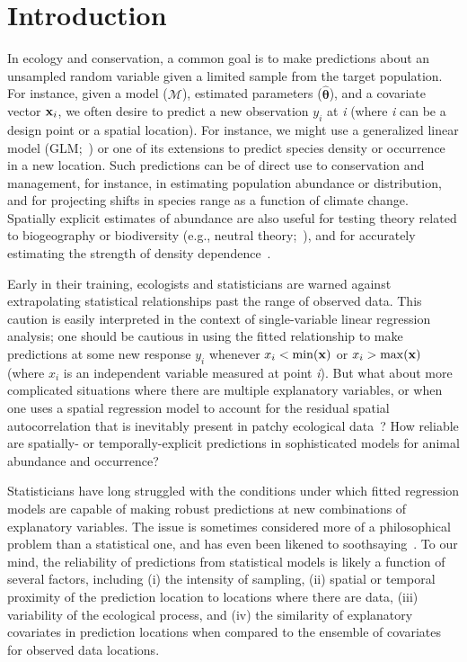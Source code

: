 \documentclass[10pt,letterpaper]{article}
\begin{document}
\section*{Introduction}
In ecology and conservation, a common goal is to make predictions about an unsampled random variable given a limited sample from the target population.  For instance, given a model ($\mathcal{M}$), estimated parameters ($\hat{\boldsymbol{\theta}}$), and a covariate vector ${\bf x}_i$, we often desire to predict a new observation $y_i$ at \textit{i} (where \textit{i} can be a design point or a spatial location).  For instance, we might use a generalized linear model (GLM;~\cite{McCullaghNelder1989}) or one of its extensions to predict species density or occurrence in a new location.  Such predictions can be of direct use to conservation and management, for instance, in estimating population abundance or distribution, and for projecting shifts in species range as a function of climate change. Spatially explicit estimates of abundance are also useful for testing theory related to biogeography or biodiversity (e.g., neutral theory;~\cite{Hubbell2001}), and for accurately estimating the strength of density dependence~\cite{ThorsonEtAlInPress}.

Early in their training, ecologists and statisticians are warned against extrapolating statistical relationships
past the range of observed data.  This caution is easily interpreted in the context of single-variable linear regression analysis; one should be cautious in using the fitted relationship to make predictions at some new response $y_i$ whenever $x_i < \min({\bf x})$ or $x_i > \max({\bf x})$ (where $x_i$ is an independent variable measured at point \textit{i}).  But what about more complicated situations
where there are multiple explanatory variables, or when one uses a spatial regression model to account for the residual spatial autocorrelation that is inevitably present in patchy ecological data~\cite{LichsteinEtAl2002}?  How reliable are spatially- or temporally-explicit predictions in sophisticated models for animal abundance and occurrence?

Statisticians have long struggled with the conditions under which fitted regression models are capable of
making robust predictions at new combinations of explanatory variables.  The issue is sometimes considered more of a
philosophical problem than a statistical one, and has even been likened to soothsaying~\cite{EhrenbergBound1993}.  To our mind, the reliability of predictions from statistical models is likely a function of several factors, including (i) the intensity of sampling,
(ii) spatial or temporal proximity of the prediction location to locations where there are data, (iii) variability of the ecological process, and (iv) the similarity of explanatory covariates in prediction locations when compared to the ensemble of covariates for observed data locations.
\end{document}

